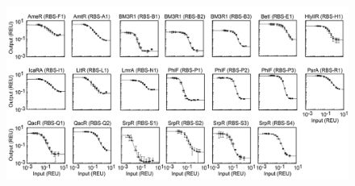 \documentclass[11pt]{article}
\begin{document}
\begin{figure}[ht!]
\centering
\includegraphics[width=16cm,height=17cm,keepaspectratio]{gate_response.png}
\label{Response functions for library gates}
\end{figure}
\end{document}
